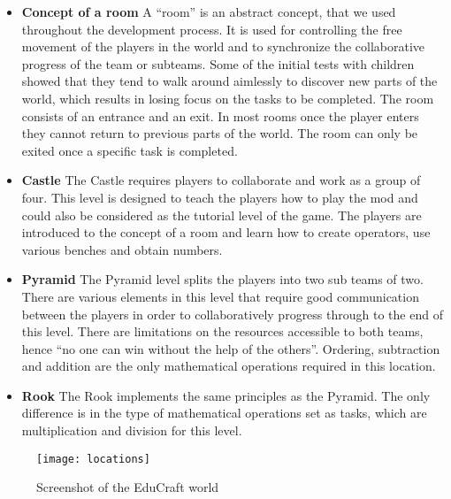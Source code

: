 \begin{itemize}
\item \textbf{Concept of a room}\newline
A “room” is an abstract concept, that we used throughout the development process. It is used for controlling the free movement of the players in the world and to synchronize the collaborative progress of the team or subteams. Some of the initial tests with children showed that they tend to walk around aimlessly to discover new parts of the world, which results in losing focus on the tasks to be completed.
The room consists of an entrance and an exit. In most rooms once the player enters they cannot return to previous parts of the world. The room can only be exited once a specific task is completed.

\item \textbf{Castle}\newline
The Castle requires players to collaborate and work as a group of four. This level is designed to teach the players how to play the mod and could also be considered as the tutorial level of the game. The players are introduced to the concept of a room and learn how to create operators, use various benches and obtain numbers.

\item \textbf{Pyramid}\newline
The Pyramid level splits the players into two sub teams of two. There are various elements in this level that require good communication between the players in order to collaboratively progress through to the end of this level. There are limitations on the resources accessible to both teams, hence ``no one can win without the help of the others''. Ordering, subtraction and addition are the only mathematical operations required in this location.

\item \textbf{Rook}\newline
The Rook implements the same principles as the Pyramid. The only difference is in the type of mathematical operations set as tasks, which are multiplication and division for this level.\newline
\end{itemize}

\begin{figure}[H]
\label{fig:world-ssot}
\caption{Screenshot of the EduCraft world}
\centering
\texttt{[image: locations]}
\end{figure}
